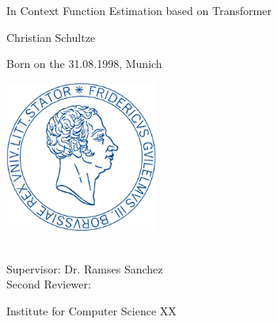 \begin{titlepage}
    \begin{center}
        \large

        \hfill

        \vfill

        \begingroup
            \Large {In Context Function Estimation based on Transformer} \\ \bigskip
        \endgroup

        {Christian Schultze} \\ \bigskip
        
        Born on the 31.08.1998, Munich \\ \bigskip
        

        \vfill

        \includegraphics[width=5cm]{abbildungen/titelseite/siegel_unibonn} \\ \bigskip\bigskip

        \mySubtitle \\ \bigskip\bigskip
        Supervisor: Dr. Ramses Sanchez \\ 
        Second Reviewer:  \\\medskip
       
        Institute for Computer Science XX \\ \medskip
        \myFaculty \\
        \myUni \\ \bigskip\bigskip
        
        
        \myTime\ %


        \vfill

    \end{center}
\end{titlepage}

